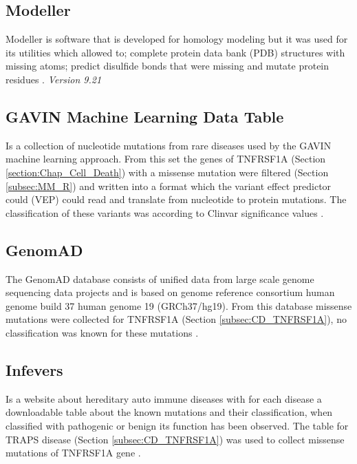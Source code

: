 \subsection{Modeller}
Modeller is software that is developed for homology modeling but it was used for its utilities which allowed to; complete protein data bank (PDB) structures with missing atoms; predict disulfide bonds that were missing and mutate protein residues \cite{modeller_about_nodate,eswar_comparative_2006}. 
\label{subsec:MM_Modeller}
\newline
\textit{Version 9.21}

\subsection{GAVIN Machine Learning Data Table}
Is a collection of nucleotide mutations from rare diseases used by the GAVIN \cite{van_der_velde_gavin:_2017} machine learning approach. From this set the genes of TNFRSF1A (Section \ref{section:Chap_Cell_Death}) with a missense mutation were filtered (Section \ref{subsec:MM_R}) and written into a format which the variant effect predictor could (VEP) \cite{ensembl_variant_nodate} could read and translate from nucleotide to protein mutations. The classification of these variants was according to Clinvar significance values \cite{ncbi_representation_nodate}. 
\label{subsec:MM_GAVIN_data_table}

\subsection{GenomAD}
The GenomAD database consists of unified data from large scale genome sequencing data projects and is based on genome reference consortium human genome build 37 human genome 19 (GRCh37/hg19). From this database missense mutations were collected for TNFRSF1A (Section \ref{subsec:CD_TNFRSF1A}), no classification was known for these mutations \cite{gnomad_gnomad_nodate}.
\label{subsec:MM_GnomAD}

\subsection{Infevers}
Is a website about hereditary auto immune diseases with for each disease a downloadable table about the known mutations and their classification, when classified with pathogenic or benign its function has been observed. The table for TRAPS disease (Section \ref{subsec:CD_TNFRSF1A}) was used to collect missense mutations of TNFRSF1A gene \cite{sarrauste_de_menthiere_infevers:_2003}.
\label{subsec:MM_Infevers}

